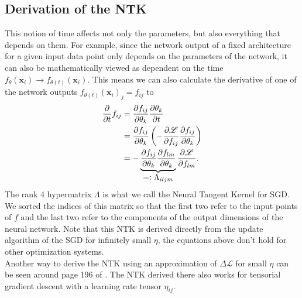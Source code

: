 \subsection{Derivation of the NTK}
This notion of time affects not only the parameters, but also everything that depends on them. For example, since the network output of a fixed architecture for a given input data point only depends on the parameters of the network, it can also be mathematically viewed as dependent on the time $f_{\theta}(\mathbf{x}_i) \rightarrow f_{\theta(t)}(\mathbf{x}_i)$. This means we can also calculate the derivative of one of the network outputs $f_{\theta(t)}(\mathbf{x}_i)_j = f_{ij}$ to
\begin{align}
	\pAbl{}{t} f_{ij} &= \pAbl{f_{ij}}{\theta_k}\pAbl{\theta_k}{t}\nonumber\\
	&= \pAbl{f_{ij}}{\theta_k} \left(- \pAbl{\mathscr{L}}{f_{ij}} \pAbl{f_{ij}}{\theta_k} \right)\label{eq:NTKarisesFromHere}\\
	&= - \underbrace{\pAbl{f_{ij}}{\theta_k} \pAbl{f_{lm}}{\theta_k}}_\mathlarger{=\vcentcolon \Lambda_{iljm}}
	\pAbl{\mathscr{L}}{f_{lm}}.\nonumber
\end{align}
The rank 4 hypermatrix $\Lambda$ is what we call the Neural Tangent Kernel for SGD. We sorted the indices of this matrix so that the first two refer to the input points of $f$ and the last two refer to the components of the output dimensions of the neural network. Note that this NTK is derived directly from the update algorithm of the SGD for infinitely small $\eta$, the equations above don't hold for other optimization systems.\\
Another way to derive the NTK using an approximation of $\Delta \mathscr{L}$ for small $\eta$ can be seen around page 196 of \cite{ThePrinciplesOfDeepLearningTheory}. The NTK derived there also works for tensorial gradient descent with a learning rate tensor $\eta_{ij}$.